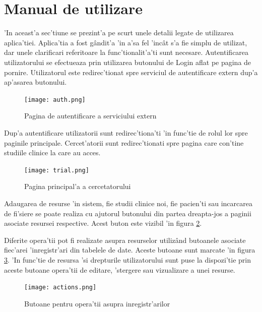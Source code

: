 \documentclass[12pt,a4paper,twoside]{report}
\begin{document}
\section{Manual de utilizare}
'In aceast'a sec'tiune se prezint'a pe scurt unele detalii legate de utilizarea aplica'tiei. Aplica'tia a fost g\^andit'a 'in a'sa fel 'inc\^at s'a fie simplu de utilizat, dar unele clarificari referitoare la func'tionalit'a'ti sunt necesare.
Autentificarea utilizatorului se efectueaza prin utilizarea butonului de Login aflat pe pagina de pornire. Utilizatorul este redirec'tionat spre serviciul de autentificare extern dup'a ap'asarea butonului.
         \begin{figure}[H]
		\begin{center}
			\texttt{[image: auth.png]}
			\caption{Pagina de autentificare a serviciului extern}
  			\label{fig:auht-ext}
  		\end{center}
  		\end{figure}

Dup'a autentificare utilizatorii sunt redirec'tiona'ti 'in func'tie de rolul lor spre paginile principale. Cercet'atorii sunt redirec'tionati spre pagina care con'tine studiile clinice la care au acces.
         \begin{figure}[H]
		\begin{center}
			\texttt{[image: trial.png]}
			\caption{Pagina principal'a a cercetatorului}
  			\label{fig:traials}
  		\end{center}
  		\end{figure}

Adaugarea de resurse 'in sistem, fie studii clinice noi, fie pacien'ti sau incarcarea de fi'siere se poate realiza cu ajutorul butonului din partea dreapta-jos a paginii asociate resursei respective. Acest buton este vizibil 'in figura \ref{fig:traials}. 

Diferite opera'tii pot fi realizate asupra resurselor utiliz\^and butoanele asociate fiec'arei 'inregistr'ari din tabelele de date. Aceste butoane sunt marcate 'in figura \ref{fig:acts}. 'In func'tie de resursa 'si drepturile utilizatorului sunt puse la dispozi'tie prin aceste butoane opera'tii de editare, 'stergere sau vizualizare a unei resurse.

         \begin{figure}[H]
		\begin{center}
			\texttt{[image: actions.png]}
			\caption{Butoane pentru opera'tii asupra inregistr'arilor}
  			\label{fig:acts}
  		\end{center}
  		\end{figure}
  		
\end{document}
